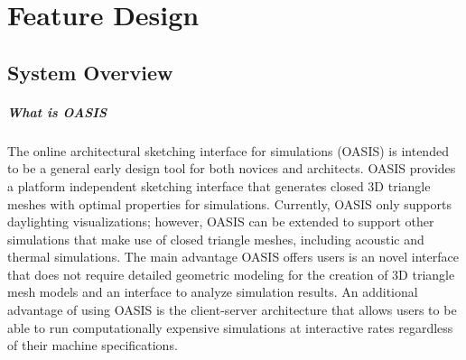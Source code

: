 \chapter{Feature Design} \label{sec:feature}


	\section{System Overview}

		\paragraph{What is OASIS}
			The online architectural sketching interface for simulations (OASIS) is intended to be a  general early design tool for both novices and architects. OASIS provides a platform independent sketching interface that generates closed 3D triangle meshes with optimal properties for simulations. Currently, OASIS only supports daylighting visualizations; however, OASIS can be extended to support other simulations that make use of closed triangle meshes, including acoustic and thermal simulations. The main advantage OASIS offers users is an novel interface that does not require detailed geometric modeling for the creation of 3D triangle mesh models and an interface to analyze simulation results. An additional advantage of using OASIS is the client-server architecture that allows users to be able to run computationally expensive simulations at interactive rates regardless of their machine specifications.

